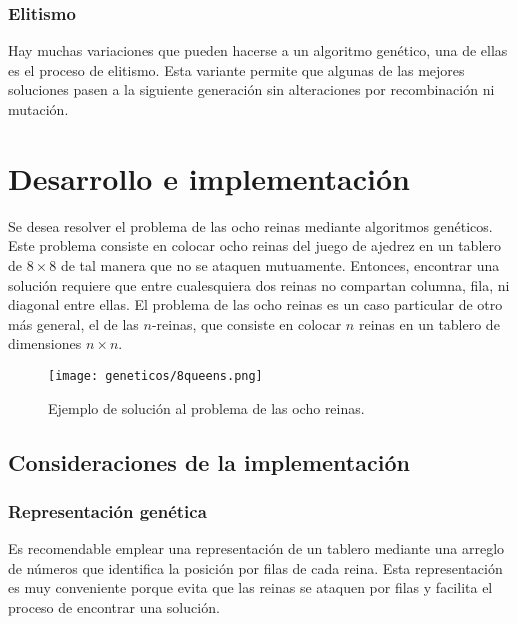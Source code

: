 \subsubsection{Elitismo}

Hay muchas variaciones que pueden hacerse a un algoritmo genético, una de ellas es el proceso de elitismo. Esta variante permite que algunas de las mejores soluciones pasen a la siguiente generación sin alteraciones por recombinación ni mutación.


\section{Desarrollo e implementaci\'on}

Se desea resolver el problema de las ocho reinas mediante algoritmos genéticos.  Este problema consiste en colocar ocho reinas del juego de ajedrez en un tablero de \(8 \times 8\) de tal manera que no se ataquen mutuamente. Entonces, encontrar una solución requiere que entre cualesquiera dos reinas no compartan columna, fila, ni diagonal entre ellas. El problema de las ocho reinas es un caso particular de otro más general, el de las \(n\)-reinas, que consiste en colocar \(n\) reinas en un tablero de dimensiones \(n \times n\).

\begin{figure}[H]
  \centering
  \texttt{[image: geneticos/8queens.png]}
  \caption{Ejemplo de solución al problema de las ocho reinas. \protect\footnotemark}
  \label{fig:queens}
\end{figure}

\subsection{Consideraciones de la implementaci\'on}

\subsubsection{Representaci\'on gen\'etica}\par

Es recomendable emplear una representación de un tablero mediante una arreglo de números que identifica la posición por filas de cada reina.
Esta representación es muy conveniente porque evita que las reinas se ataquen por filas y facilita el proceso de encontrar una solución.

